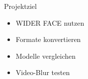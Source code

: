 \begin{frame}{Projektziel}
\begin{itemize}
    \item WIDER FACE nutzen
    \item Formate konvertieren
    \item Modelle vergleichen
    \item Video-Blur testen
\end{itemize}
\end{frame}
